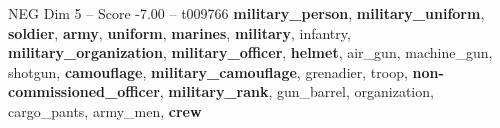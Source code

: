 \begin{textsample}{NEG Dim 5 – Score -7.00 – t009766}  \label{ex:f5_neg_010}
\textbf{military\_person}, \textbf{military\_uniform}, \textbf{soldier}, \textbf{army}, \textbf{uniform}, \textbf{marines}, \textbf{military}, infantry, \textbf{military\_organization}, \textbf{military\_officer}, \textbf{helmet}, air\_gun, machine\_gun, shotgun, \textbf{camouflage}, \textbf{military\_camouflage}, grenadier, troop, \textbf{non-commissioned\_officer}, \textbf{military\_rank}, gun\_barrel, organization, cargo\_pants, army\_men, \textbf{crew}

\end{textsample}
